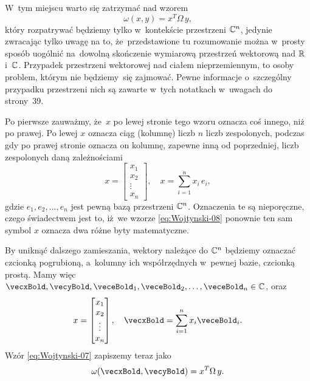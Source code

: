 \documentclass[a4paper,11pt]{article}
\numberwithin{equation}{section}
\begin{document}
\VerSpaceFour





\noindent
{} W~tym miejscu warto się zatrzymać nad wzorem
\begin{equation}
  \label{eq:Wojtynski-07}
  \omega( x, y ) = x^{ T } \Omega \, y,
\end{equation}
który rozpatrywać będziemy tylko w~kontekście przestrzeni $\mathbb{C}^{ n }$,
jedynie zwracając tylko uwagę na to, że~przedstawione tu rozumowanie można
w~prosty sposób uogólnić na~dowolną skończenie wymiarową przestrzeń
wektorową nad $\mathbb{R}$ i~$\mathbb{C}$. Przypadek przestrzeni wektorowej nad ciałem
nieprzemiennym, to osoby problem, którym nie będziemy~się zajmować. Pewne
informacje o~szczególny przypadku przestrzeni nich są zawarte w~tych
notatkach w~uwagach do strony~39.

Po pierwsze zauważmy, że~$x$ po lewej stronie tego wzoru oznacza coś
innego, niż po prawej. Po lewej $x$ oznacza ciąg (kolumnę) liczb $n$ liczb
zespolonych, podczas gdy po prawej stronie oznacza on kolumnę, zapewne inną
od poprzedniej, liczb zespolonych daną zależnościami
\begin{equation}
  \label{eq:Wojtynski-08}
  x =
  \begin{bmatrix}
    x_{ 1 } \\
    x_{ 2 } \\
    \vdots \\
    x_{ n }
  \end{bmatrix}, \quad
  x = \sum_{ i = 1 }^{ n } x_{ i } \, e_{ i },
\end{equation}
gdzie $e_{ 1 }, e_{ 2 }, \ldots, e_{ n }$ jest pewną bazą przestrzeni $\mathbb{C}^{ n }$.
Oznaczenia te są nieporęczne, czego świadectwem jest to, iż~we wzorze
\eqref{eq:Wojtynski-08} ponownie ten sam symbol $x$ oznacza dwa różne
byty matematyczne.

By uniknąć dalszego zamieszania, wektory należące do
$\mathbb{C}^{ n }$ będziemy oznaczać czcionką pogrubioną, a~kolumny ich
współrzędnych w~pewnej bazie, czcionką prostą. Mamy więc
$\vecxBold, \vecyBold, \veceBold_{ 1 }, \veceBold_{ 2 }, \ldots, \veceBold_{ n }
\in \Cbb$, oraz
\begin{equation}
  \label{eq:Wojtynski-09}
  x =
  \begin{bmatrix}
    x_{ 1 } \\
    x_{ 2 } \\
    \vdots \\
    x_{ n }
  \end{bmatrix}, \quad
  \vecxBold = \sum_{ i = 1 }^{ n } x_{ i } \veceBold_{ i }.
\end{equation}
Wzór \eqref{eq:Wojtynski-07} zapiszemy teraz jako
\begin{equation}
  \label{eq:Wojtynski-10}
  \omega( \vecxBold, \vecyBold ) = x^{ T } \Omega \, y.
\end{equation}
\end{document}
